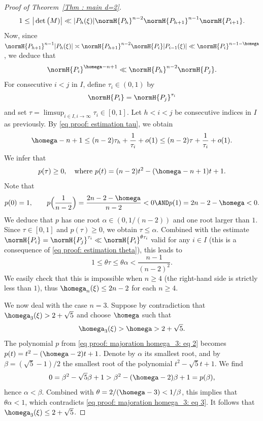 \begin{proof}[Proof of Theorem~\ref{Thm : main d=2}]
\begin{equation*}
1 \leq \big|\det\big(M)\big| \ll |P_{h}(\xi)|\normH{P_{h}}^{n-2}\normH{P_{h+1}}^{n-1}\normH{P_{i+1}}.
\end{equation*}
Now, since $\normH{P_{h+1}}^{n-1}|P_{h}(\xi)| \asymp \normH{P_{h+1}}^{n-2}\normH{P_i}|P_{i-1}(\xi)| \ll \normH{P_i}^{n-1-\homega}$, we deduce that
\begin{equation}
\label{eq proof: estimation tau}
\normH{P_i}^{\homega-n+1} \ll \normH{P_{h}}^{n-2}\normH{P_{j}}.
\end{equation}
For consecutive $i<j$ in $I$, define $\tau_i\in(0,1)$ by
\[
\normH{P_i} = \normH{P_j}^{\tau_i}
\]
and set $\tau = \limsup_{i\in I, i\to\infty} \tau_i \in [0,1]$. Let $h<i<j$ be consecutive indices in $I$ as previously. By \eqref{eq proof: estimation tau}, we obtain
\[
\homega-n+1 \leq (n-2)\tau_h + \frac{1}{\tau_i} +o(1) \leq (n-2)\tau + \frac{1}{\tau_i} +o(1).
\]
We infer that
\begin{equation}
\label{eq proof: majoration homega_3: eq 2}
p(\tau) \geq 0, \quad \textrm{where } p(t) = (n-2)t^2-(\homega-n+1)t+1.
\end{equation}
Note that
\begin{equation*}
p(0) = 1, \qquad p\Bigl(\frac{1}{n-2}\Bigr) = \frac{2n-2-\homega}{n-2} < 0 \AND p(1) = 2n-2-\homega < 0.
\end{equation*}
We deduce that $p$ has one root $\alpha\in(0,1/(n-2))$ and one root larger than $1$. Since $\tau\in[0,1]$ and $p(\tau)\geq 0$, we obtain $\tau \leq \alpha$. Combined with the estimate $\normH{P_i} = \normH{P_j}^{\tau_i} \ll \normH{P_i}^{\theta\tau_i}$ valid
for any $i\in I$ (this is a consequence of \eqref{eq proof: estimation theta}), this leads to
\begin{equation}
\label{eq proof: majoration homega_3: eq 3}
1 \leq \theta\tau \leq \theta\alpha < \frac{n-1}{(n-2)^2}.
\end{equation}
We easily check that this is impossible when $n\geq 4$ (the right-hand side is strictly less than $1$), thus $\homega_n(\xi)\leq 2n-2$ for each $n\geq 4$.

We now deal with the case $n=3$. Suppose by contradiction that $\homega_3(\xi) > 2+\sqrt 5$ and choose $\homega$ such that
\[
\homega_3(\xi) > \homega > 2+\sqrt 5.
\]
The polynomial $p$ from \eqref{eq proof: majoration homega_3: eq 2} becomes $p(t) = t^2-(\homega-2)t+1$. Denote by $\alpha$ its smallest root, and by $\beta = (\sqrt 5 -1)/2$ the smallest root of the polynomial $t^2-\sqrt 5 t + 1$. We find
\begin{equation*}
0 = \beta^2-\sqrt 5 \beta + 1 > \beta^2-(\homega-2 )\beta + 1 = p(\beta),
\end{equation*}
hence $\alpha < \beta$. Combined with $\theta = 2/(\homega-3) < 1/\beta$, this implies that $\theta \alpha < 1$, which contradicts \eqref{eq proof: majoration homega_3: eq 3}. It follows that $\homega_3(\xi) \leq 2+\sqrt 5$.
\end{proof}

